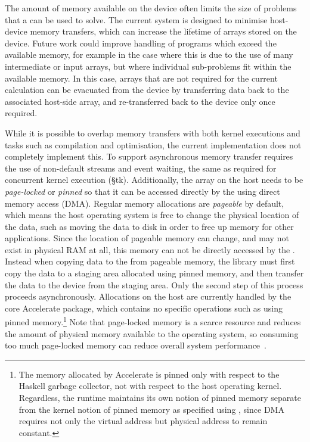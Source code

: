 The amount of memory available on the device often limits the size of problems
that a \GPU can be used to solve. The current system is designed to minimise
host-device memory transfers, which can increase the lifetime of arrays stored
on the device. Future work could improve handling of programs which exceed the
available memory, for example in the case where this is due to the use of many
intermediate or input arrays, but where individual sub-problems fit within the
available memory. In this case, arrays that are not required for the current
calculation can be evacuated from the device by transferring data back to the
associated host-side array, and re-transferred back to the device only once
required.

While it is possible to overlap memory transfers with both kernel executions and
tasks such as compilation and optimisation, the current implementation does not
completely implement this. To support asynchronous memory transfer requires the
use of non-default streams and event waiting, the same as required for
concurrent kernel execution (\S tk). Additionally, the array on the host needs
to be \emph{page-locked} or \emph{pinned} so that it can be accessed directly by
the \GPU using direct memory access (DMA). Regular memory allocations are
\emph{pageable} by default, which means the host operating system is free to
change the physical location of the data, such as moving the data to disk in
order to free up memory for other applications. Since the location of pageable
memory can change, and may not exist in physical RAM at all, this memory can not
be directly accessed by the \GPU\@. Instead when copying data to the \GPU from
pageable memory, the \CUDA library must first copy the data to a staging area
allocated using pinned memory, and then transfer the data to the device from the
staging area. Only the second step of this process proceeds asynchronously.
Allocations on the host are currently handled by the core Accelerate package,
which contains no \CUDA specific operations such as using pinned
memory.\footnote{The memory allocated by Accelerate is pinned only with respect
to the Haskell garbage collector, not with respect to the host operating kernel.
Regardless, the \CUDA runtime maintains its own notion of pinned memory
separate from the kernel notion of pinned memory as specified using
, since DMA requires not only the virtual address but physical
address to remain constant.} Note that page-locked memory is a scarce resource
and reduces the amount of physical memory available to the operating system, so
consuming too much page-locked memory can reduce overall system
performance~\cite{NVIDIA:2012wf}.


